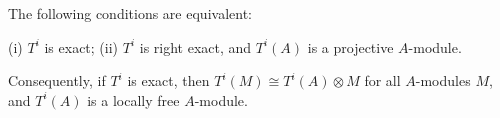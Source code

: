 The following conditions are equivalent:

(i) $T^i$ is exact;
(ii) $T^i$ is right exact, and $T^i(A)$ is a projective $A$-module.

Consequently, if $T^i$ is exact, then $T^i(M) \cong T^i(A) \otimes M$ for all $A$-modules $M$, and $T^i(A)$ is a locally free $A$-module.

